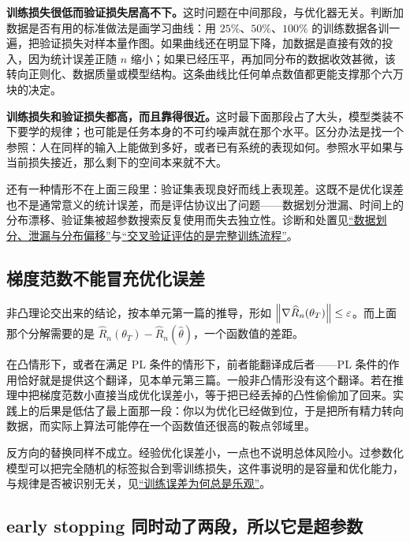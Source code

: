 \textbf{训练损失很低而验证损失居高不下。}这时问题在中间那段，与优化器无关。判断加数据是否有用的标准做法是画学习曲线：用 \(25\%\)、\(50\%\)、\(100\%\) 的训练数据各训一遍，把验证损失对样本量作图。如果曲线还在明显下降，加数据是直接有效的投入，因为统计误差正随 \(n\) 缩小；如果已经压平，再加同分布的数据收效甚微，该转向正则化、数据质量或模型结构。这条曲线比任何单点数值都更能支撑那个六万块的决定。

\textbf{训练损失和验证损失都高，而且靠得很近。}这时最下面那段占了大头，模型类装不下要学的规律；也可能是任务本身的不可约噪声就在那个水平。区分办法是找一个参照：人在同样的输入上能做到多好，或者已有系统的表现如何。参照水平如果与当前损失接近，那么剩下的空间本来就不大。

还有一种情形不在上面三段里：验证集表现良好而线上表现差。这既不是优化误差也不是通常意义的统计误差，而是评估协议出了问题——数据划分泄漏、时间上的分布漂移、验证集被超参数搜索反复使用而失去独立性。诊断和处置见\hyperref[sec:13-Machine-Learning/01-Learning-Problems-and-Evaluation/04]{``数据划分、泄漏与分布偏移''}与\hyperref[sec:11-Mathematical-Statistics/06-Resampling-and-Model-Selection/03]{``交叉验证评估的是完整训练流程''}。

\subsection{梯度范数不能冒充优化误差}

非凸理论交出来的结论，按本单元第一篇的推导，形如 \(\left\lVert\nabla\widehat R_n(\theta_T)\right\rVert\le\varepsilon\)。而上面那个分解需要的是 \(\widehat R_n(\theta_T)-\widehat R_n(\widehat\theta)\)，一个函数值的差距。

在凸情形下，或者在满足 PL 条件的情形下，前者能翻译成后者——PL 条件的作用恰好就是提供这个翻译，见本单元第三篇。一般非凸情形没有这个翻译。若在推理中把梯度范数小直接当成优化误差小，等于把已经丢掉的凸性偷偷加了回来。实践上的后果是低估了最上面那一段：你以为优化已经做到位，于是把所有精力转向数据，而实际上算法可能停在一个函数值还很高的鞍点邻域里。

反方向的替换同样不成立。经验优化误差小，一点也不说明总体风险小。过参数化模型可以把完全随机的标签拟合到零训练损失，这件事说明的是容量和优化能力，与规律是否被识别无关，见\hyperref[sec:13-Machine-Learning/10-Learning-Theory/01]{``训练误差为何总是乐观''}。

\subsection{early stopping 同时动了两段，所以它是超参数}


